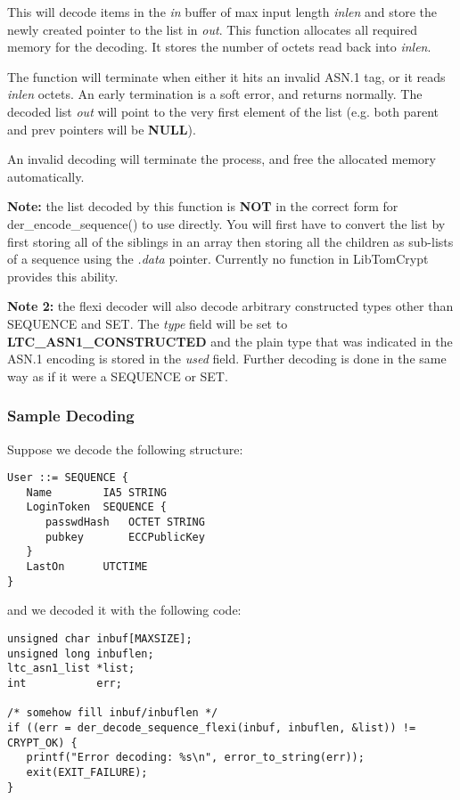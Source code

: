 \documentclass[synpaper]{book}
\begin{document}
This will decode items in the \textit{in} buffer of max input length \textit{inlen} and store the newly created pointer to the list in \textit{out}.  This function allocates
all required memory for the decoding.  It stores the number of octets read back into \textit{inlen}.

The function will terminate when either it hits an invalid ASN.1 tag, or it reads \textit{inlen} octets.  An early termination is a soft error, and returns
normally.  The decoded list \textit{out} will point to the very first element of the list (e.g. both parent and prev pointers will be \textbf{NULL}).

An invalid decoding will terminate the process, and free the allocated memory automatically.

\textbf{Note:} the list decoded by this function is \textbf{NOT} in the correct form for der\_encode\_sequence() to use directly.  You will first
have to convert the list by first storing all of the siblings in an array then storing all the children as sub-lists of a sequence using the \textit{.data}
pointer.  Currently no function in LibTomCrypt provides this ability.

\textbf{Note 2:} the flexi decoder will also decode arbitrary constructed types
other than SEQUENCE and SET. The \textit{type} field will be set to
\textbf{LTC\_ASN1\_CONSTRUCTED} and the plain type that was indicated in the ASN.1
encoding is stored in the \textit{used} field. Further decoding is done in the
same way as if it were a SEQUENCE or SET.

\subsubsection{Sample Decoding}
Suppose we decode the following structure:
\begin{small}
\begin{verbatim}
User ::= SEQUENCE {
   Name        IA5 STRING
   LoginToken  SEQUENCE {
      passwdHash   OCTET STRING
      pubkey       ECCPublicKey
   }
   LastOn      UTCTIME
}
\end{verbatim}
\end{small}
\begin{flushleft}and we decoded it with the following code:\end{flushleft}

\begin{small}
\begin{verbatim}
unsigned char inbuf[MAXSIZE];
unsigned long inbuflen;
ltc_asn1_list *list;
int           err;

/* somehow fill inbuf/inbuflen */
if ((err = der_decode_sequence_flexi(inbuf, inbuflen, &list)) != CRYPT_OK) {
   printf("Error decoding: %s\n", error_to_string(err));
   exit(EXIT_FAILURE);
}
\end{verbatim}
\end{small}
\end{document}
